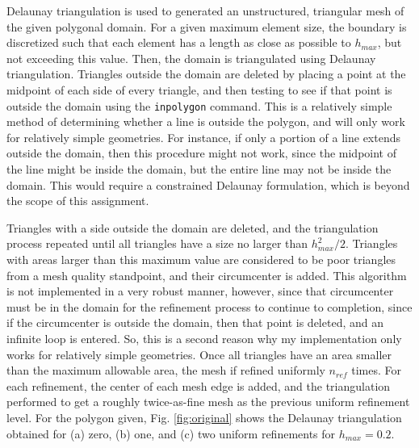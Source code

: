 \documentclass[10pt]{article}
\begin{document}
Delaunay triangulation is used to generated an unstructured, triangular mesh of the given polygonal domain. For a given maximum element size, the boundary is discretized such that each element has a length as close as possible to \(h_{max}\), but not exceeding this value. Then, the domain is triangulated using Delaunay triangulation. Triangles outside the domain are deleted by placing a point at the midpoint of each side of every triangle, and then testing to see if that point is outside the domain using the {\tt inpolygon} command. This is a relatively simple method of determining whether a line is outside the polygon, and will only work for relatively simple geometries. For instance, if only a portion of a line extends outside the domain, then this procedure might not work, since the midpoint of the line might be inside the domain, but the entire line may not be inside the domain. This would require a constrained Delaunay formulation, which is beyond the scope of this assignment. 

Triangles with a side outside the domain are deleted, and the triangulation process repeated until all triangles have a size no larger than \(h_{max}^2/2\). Triangles with areas larger than this maximum value are considered to be poor triangles from a mesh quality standpoint, and their circumcenter is added. This algorithm is not implemented in a very robust manner, however, since that circumcenter must be in the domain for the refinement process to continue to completion, since if the circumcenter is outside the domain, then that point is deleted, and an infinite loop is entered. So, this is a second reason why my implementation only works for relatively simple geometries. Once all triangles have an area smaller than the maximum allowable area, the mesh if refined uniformly \(n_{ref}\) times. For each refinement, the center of each mesh edge is added, and the triangulation performed to get a roughly twice-as-fine mesh as the previous uniform refinement level. For the polygon given, Fig. \ref{fig:original} shows the Delaunay triangulation obtained for (a) zero, (b) one, and (c) two uniform refinements for \(h_{max}=0.2\).
\end{document}

